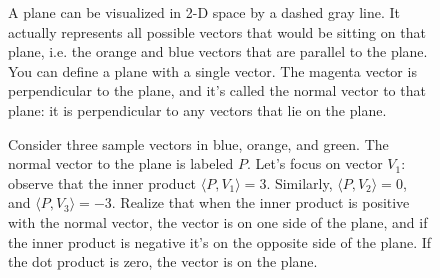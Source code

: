 \documentclass[12pt]{article}
\begin{document}
\begin{figure}
  \begin{center}
  \end{center}
  \caption{A plane can be visualized in 2-D space by a dashed gray line. It actually represents all possible vectors that would be sitting on that plane, i.e. the orange and blue vectors that are parallel to the plane. You can define a plane with a single vector. The magenta vector is perpendicular to the plane, and it's called the normal vector to that plane: it is perpendicular to any vectors that lie on the plane.}
\end{figure}

\begin{figure}
  \begin{center}
  \end{center}
  \caption{Consider three sample vectors in blue, orange, and green. The normal vector to the plane is labeled $P$. Let's focus on vector $V_1$: observe that the inner product $\langle P, V_1 \rangle = 3$. Similarly, $\langle P, V_2 \rangle = 0$, and $\langle P, V_3 \rangle = -3$. Realize that when the inner product is positive with the normal vector, the vector is on one side of the plane, and if the inner product is negative it's on the opposite side of the plane. If the dot product is zero, the vector is on the plane.}
\end{figure}
\end{document}
